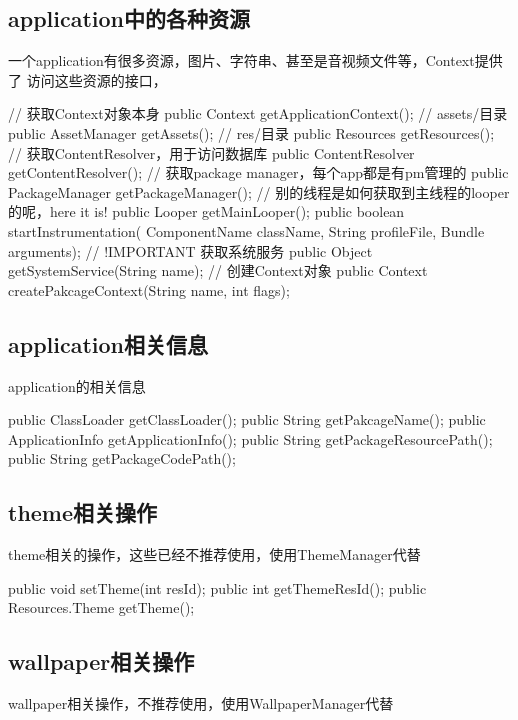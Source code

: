 ﻿\documentclass[a4paper,11pt]{article}
\begin{document}
\subsection[application中的各种资源]{application中的各种资源}
一个application有很多资源，图片、字符串、甚至是音视频文件等，Context提供了
访问这些资源的接口，

\begin{javacode}
// 获取Context对象本身
public Context getApplicationContext();
// assets/目录
public AssetManager getAssets();
// res/目录
public Resources getResources();
// 获取ContentResolver，用于访问数据库
public ContentResolver getContentResolver();
// 获取package manager，每个app都是有pm管理的
public PackageManager getPackageManager();
// 别的线程是如何获取到主线程的looper的呢，here it is!
public Looper getMainLooper();
public boolean startInstrumentation(
             ComponentName className,
             String profileFile,
             Bundle arguments);
// !IMPORTANT 获取系统服务
public Object getSystemService(String name);
// 创建Context对象
public Context createPakcageContext(String name, int flags);
\end{javacode}

\subsection[application相关信息]{application相关信息}
application的相关信息

\begin{javacode}
public ClassLoader getClassLoader();
public String getPakcageName();
public ApplicationInfo getApplicationInfo();
public String getPackageResourcePath();
public String getPackageCodePath();
\end{javacode}

\subsection[theme相关操作]{theme相关操作}
theme相关的操作，这些已经不推荐使用，使用ThemeManager代替

\begin{javacode}
public void setTheme(int resId);
public int getThemeResId();
public Resources.Theme getTheme();
\end{javacode}

\subsection[wallpaper相关操作]{wallpaper相关操作}
wallpaper相关操作，不推荐使用，使用WallpaperManager代替
\end{document}
